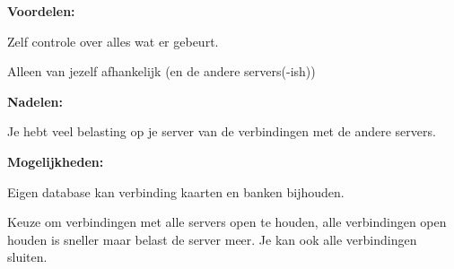 \documentclass{article}
\begin{document}
\vspace{5mm}
\textbf{Voordelen:}
\begin{description}
\item Zelf controle over alles wat er gebeurt.
\item Alleen van jezelf afhankelijk (en de andere servers(-ish))
\end{description}

\vspace{5mm}
\textbf{Nadelen:}
\begin{description}
\item Je hebt veel belasting op je server van de verbindingen met de andere servers.
\end{description}

\vspace{5mm}
\textbf{Mogelijkheden:}
\begin{description}
\item Eigen database kan verbinding kaarten en banken bijhouden.
\item Keuze om verbindingen met alle servers open te houden, alle verbindingen open houden is sneller maar belast de server meer. Je kan ook alle verbindingen sluiten.
\end{description}
\end{document}

